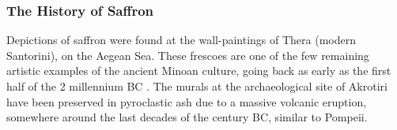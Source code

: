 














\subsubsection{The History of Saffron}

Depictions of saffron were found at the wall-paintings of Thera (modern Santorini), on the Aegean Sea. These frescoes are one of the few remaining artistic examples of the ancient Minoan culture, going back as early as the first half of the 2 millennium BC \autocite[29-31]{doumas_wall-paintings_1992}. The murals at the archaeological site of Akrotiri have been preserved in pyroclastic ash due to a massive volcanic eruption, somewhere around the last decades of the  century BC, similar to Pompeii.






